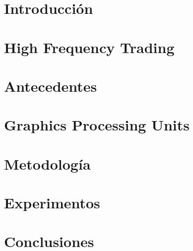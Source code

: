 \documentclass[spanish,12pt,letterpaper,oneside]{book}
\begin{document}
    

    \begin{spacing}{.97}
        \newpage
        

        \newpage
        
        

        \chapter{Introducción}
        \label{ch:introduction}
        

        \chapter{High Frequency Trading}
        \label{ch:hft}
        

        \chapter{Antecedentes}
        \label{ch:backgound}
        

        \chapter{Graphics Processing Units}
        \label{ch:gpu}
        
     
        \chapter{Metodología}
        \label{ch:implementacion}
        

        \chapter{Experimentos}
        \label{ch:experimentos}
        

        \chapter{Conclusiones}
        \label{ch:conclusiones}
        

        
        
        \nocite{*}
    \end{spacing}
\end{document}
